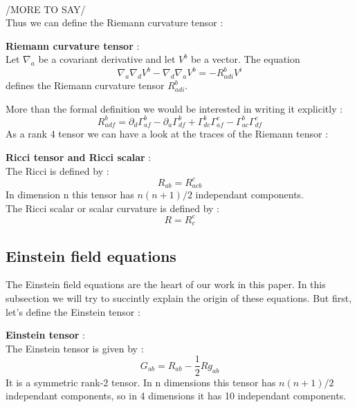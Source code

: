 \documentclass[a4paper,12pt]{article}
\theoremstyle{definition}
\begin{document}
\\/MORE TO SAY/\\
Thus we can define the Riemann curvature tensor :
\begin{definition}
	\textbf{Riemann curvature tensor} :\\
	Let $\nabla_a$ be a covariant derivative and let $V^b$ be a vector. The equation
	\begin{equation*}
		\nabla _a \nabla _d V^b - \nabla _d \nabla _aV^b=-R_{adi}^b V^i
	\end{equation*}
	defines the Riemann curvature tensor $R_{adi}^b$.
\end{definition}
More than the formal definition we would be interested in writing it explicitly :
\begin{equation}
	R_{adf}^b=\partial_d\Gamma^b_{af}-\partial_a\Gamma^b_{df}+\Gamma^b_{dc}\Gamma^c_{af}-\Gamma^b_{ac}\Gamma^c_{df}
\end{equation}
As a rank 4 tensor we can have a look at the traces of the Riemann tensor :
\begin{definition}
	\textbf{Ricci tensor and Ricci scalar} :\\
	The Ricci is defined by :
	\begin{equation}
		R_{ab}=R_{acb}^c
	\end{equation}
	In dimension n this tensor has $n(n+1)/2$ independant components.\\
	The Ricci scalar or scalar curvature is defined by :
	\begin{equation}
		R=R_c^c
	\end{equation}
\end{definition}
\subsection{Einstein field equations}
The Einstein field equations are the heart of our work in this paper.
In this subsection we will try to succintly explain the origin of these equations.
But first, let's define the Einstein tensor : 
\begin{definition}
	\textbf{Einstein tensor} :\\
	The Einstein tensor is given by :
	\begin{equation}
		G_{ab}=R_{ab}-\frac{1}{2}Rg_{ab}
	\end{equation}
	It is a symmetric rank-2 tensor. In n dimensions this tensor has $n(n+1)/2$ independant components, so in 4 dimensions it has 10 independant components.
\end{definition}
\end{document}
